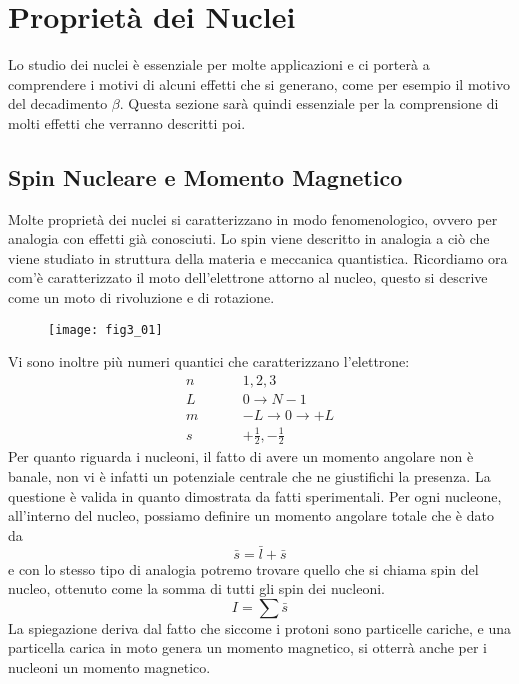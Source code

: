 \section{Proprietà dei Nuclei}
Lo studio dei nuclei è essenziale per molte applicazioni e ci porterà a comprendere i motivi di alcuni effetti che si generano, come per esempio il motivo del decadimento $\beta$. 
Questa sezione sarà quindi essenziale per la comprensione di molti effetti che verranno descritti poi.
\subsection{Spin Nucleare e Momento Magnetico}
Molte proprietà dei nuclei si caratterizzano in modo fenomenologico, ovvero per analogia con effetti già conosciuti.
Lo spin viene descritto in analogia a ciò che viene studiato in struttura della materia e meccanica quantistica. 
Ricordiamo ora com'è caratterizzato il moto dell'elettrone attorno al nucleo, questo si descrive come un moto di rivoluzione e di rotazione.
\begin{figure}
\centering
\texttt{[image: fig3\_01]}
\end{figure}
Vi sono inoltre più numeri quantici che caratterizzano l'elettrone:
\begin{equation}
\begin{split}
n\hspace{1cm} & 1, 2,3\\
L\hspace{1cm} & 0\to N-1\\
m\hspace{1cm} & -L\to0\to+L\\
s\hspace{1cm} & +\frac{1}{2}, -\frac{1}{2}
\end{split}
\end{equation}
Per quanto riguarda i nucleoni, il fatto di avere un momento angolare non è banale, non vi è infatti un potenziale centrale che ne giustifichi la presenza.
La questione è valida in quanto dimostrata da fatti sperimentali.
Per ogni nucleone, all'interno del nucleo, possiamo definire un momento angolare totale che è dato da 
\begin{equation}
\bar s =\bar l + \bar s
\end{equation}
e con lo stesso tipo di analogia potremo trovare quello che si chiama spin del nucleo, ottenuto come la somma di tutti gli spin dei nucleoni.
\begin{equation}
I=\sum \bar s
\end{equation}
La spiegazione deriva dal fatto che siccome i protoni sono particelle cariche, e una particella carica in moto genera un momento magnetico, si otterrà anche per i nucleoni un momento magnetico.

